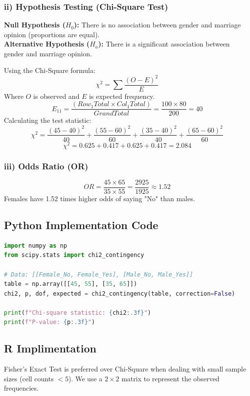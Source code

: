 \documentclass[12pt, a4paper]{article}
\begin{document}
\subsubsection{ii) Hypothesis Testing (Chi-Square Test)}
\textbf{Null Hypothesis ($H_0$):} There is no association between gender and marriage opinion (proportions are equal). \\
\textbf{Alternative Hypothesis ($H_a$):} There is a significant association between gender and marriage opinion.

Using the Chi-Square formula:
\[ \chi^2 = \sum \frac{(O - E)^2}{E} \]
Where $O$ is observed and $E$ is expected frequency.
\[ E_{11} = \frac{(Row_1 Total \times Col_1 Total)}{Grand Total} = \frac{100 \times 80}{200} = 40 \]
Calculating the test statistic:
\[ \chi^2 = \frac{(45-40)^2}{40} + \frac{(55-60)^2}{60} + \frac{(35-40)^2}{40} + \frac{(65-60)^2}{60} \]
\[ \chi^2 = 0.625 + 0.417 + 0.625 + 0.417 = 2.084 \]

\subsubsection{iii) Odds Ratio (OR)}
\[ OR = \frac{45 \times 65}{35 \times 55} = \frac{2925}{1925} \approx 1.52 \]
Females have 1.52 times higher odds of saying "No" than males.

\subsection{ Python Implementation Code}

\begin{lstlisting}[language=Python, caption=Python implementation for Marriage Opinion]
import numpy as np
from scipy.stats import chi2_contingency

# Data: [[Female_No, Female_Yes], [Male_No, Male_Yes]]
table = np.array([[45, 55], [35, 65]])
chi2, p, dof, expected = chi2_contingency(table, correction=False)

print(f"Chi-square statistic: {chi2:.3f}")
print(f"P-value: {p:.3f}")
\end{lstlisting}

\subsection{ R Implimentation}
Fisher's Exact Test is preferred over Chi-Square when dealing with small sample sizes (cell counts $< 5$). We use a $2 \times 2$ matrix to represent the observed frequencies.
\end{document}
